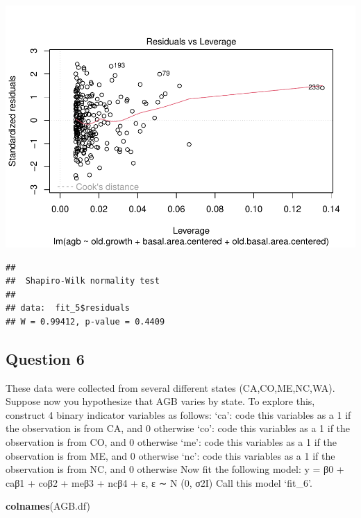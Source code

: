 \documentclass[
]{article}
\newenvironment{Shaded}{\begin{snugshade}}{\end{snugshade}}
\newcommand{\FunctionTok}[1]{\textcolor[rgb]{0.13,0.29,0.53}{\textbf{#1}}}
\newcommand{\NormalTok}[1]{#1}
\newcommand{\SpecialCharTok}[1]{\textcolor[rgb]{0.81,0.36,0.00}{\textbf{#1}}}
\begin{document}
\includegraphics{Stats-Lab-7_files/figure-latex/unnamed-chunk-14-4.pdf}

\begin{Shaded}
\end{Shaded}

\begin{verbatim}
## 
##  Shapiro-Wilk normality test
## 
## data:  fit_5$residuals
## W = 0.99412, p-value = 0.4409
\end{verbatim}

\hypertarget{question-6}{%
\subsection{Question 6}\label{question-6}}

These data were collected from several different states
(CA,CO,ME,NC,WA). Suppose now you hypothesize that AGB varies by state.
To explore this, construct 4 binary indicator variables as follows:
`ca': code this variables as a 1 if the observation is from CA, and 0
otherwise `co': code this variables as a 1 if the observation is from
CO, and 0 otherwise `me': code this variables as a 1 if the observation
is from ME, and 0 otherwise `nc': code this variables as a 1 if the
observation is from NC, and 0 otherwise Now fit the following model: y =
β0 + caβ1 + coβ2 + meβ3 + ncβ4 + ε, ε ∼ N (0, σ2I) Call this model
`fit\_6'.

\begin{Shaded}
\begin{Highlighting}[]
\FunctionTok{colnames}\NormalTok{(AGB.df)}
\end{Highlighting}
\end{Shaded}
\end{document}
